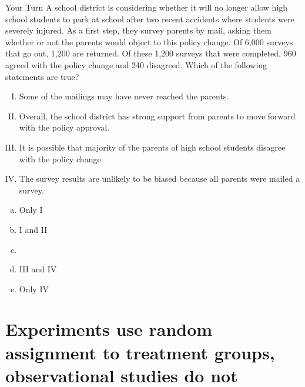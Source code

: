 \documentclass[11pt]{beamer}
\newcommand{\textitMult}[1]{
\only<1>{#1}
\only<2->{\alert{\textbf{#1}}}
}
\begin{document}

\begin{frame}[shrink]

{\small
\footnotesize{
\begin{exampleblock}{Your Turn}
A school district is considering whether it will no longer allow high school 
students to park at school after two recent accidents where students were severely 
injured. As a first step, they survey parents by mail, asking them whether or not the 
parents would object to this policy change. Of 6,000 surveys that go out, 1,200 are 
returned. Of these 1,200 surveys that were completed, 960 agreed with the policy change 
and 240 disagreed. Which of the following statements are true?
\end{exampleblock}}

\begin{enumerate}[I.]
\item Some of the mailings may have never reached the parents.
\item Overall, the school district has strong support from parents to move forward with 
the policy approval.
\item It is possible that majority of the parents of high school students disagree with 
the policy change.
\item The survey results are unlikely to be biased because all parents were mailed a 
survey. 
\end{enumerate}

\begin{multicols}{5}
\begin{enumerate}[(a)]
\item Only I
\item I and II
\item \textitMult{I and III}
\item III and IV
\item Only IV
\end{enumerate}
\end{multicols}
}

\end{frame}


\section{Experiments use random assignment to treatment groups, observational studies do not}
\label{mi4}
\end{document}
